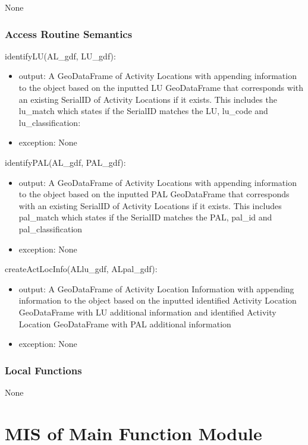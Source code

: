 \documentclass[12pt, titlepage]{article}
\begin{document}
None

\subsubsection{Access Routine Semantics}

identifyLU(AL\_gdf, LU\_gdf):
\begin{itemize}
\item output: A GeoDataFrame of Activity Locations with appending information to the object based on the inputted LU GeoDataFrame that corresponds with an existing SerialID of Activity Locations if it exists. This includes the lu\_match which states if the SerialID matches the LU, lu\_code and lu\_classification:
\item exception: None
\end{itemize}

identifyPAL(AL\_gdf, PAL\_gdf):
\begin{itemize}
\item output: A GeoDataFrame of Activity Locations with appending information to the object based on the inputted PAL GeoDataFrame that corresponds with an existing SerialID of Activity Locations if it exists. This includes  pal\_match which states if the SerialID matches the PAL, pal\_id and pal\_classification
\item exception: None
\end{itemize}

createActLocInfo(ALlu\_gdf, ALpal\_gdf):
\begin{itemize}
\item output: A GeoDataFrame of Activity Location Information with appending information to the object based on the inputted identified Activity Location GeoDataFrame with LU additional information and identified Activity Location GeoDataFrame with PAL additional information 
\item exception: None
\end{itemize}

\subsubsection{Local Functions}
None

\newpage

\section{MIS of Main Function Module} \label{Main} %
\end{document}
